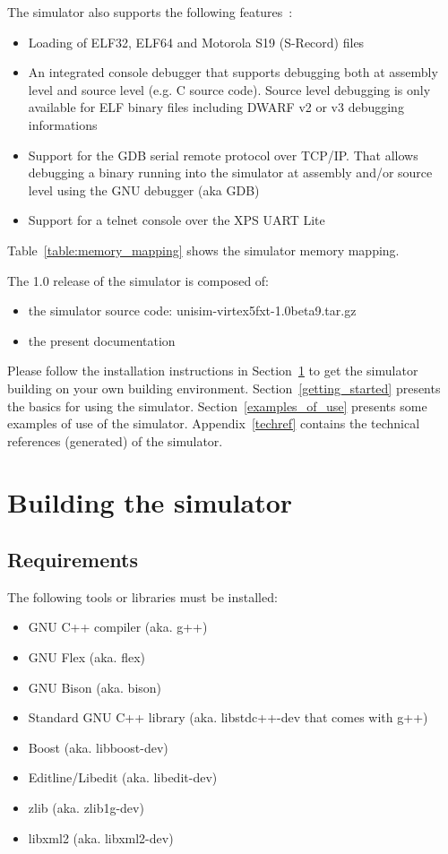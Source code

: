 \cleardoublepage

\noindent The simulator also supports the following features :
\begin{itemize}
\item Loading of ELF32, ELF64 \cite{ELF} and Motorola S19 (S-Record) \cite{S19} files
\item An integrated console debugger that supports debugging both at assembly level and source level (e.g. C source code). Source level debugging is only available for ELF binary files including DWARF v2 or v3 \cite{DWARF3} debugging informations
\item Support for the GDB \cite{GDB} serial remote protocol over TCP/IP. That allows debugging a binary running into the simulator at assembly and/or source level using the GNU debugger (aka GDB)
\item Support for a telnet console over the XPS UART Lite
\end{itemize}

Table~\ref{table:memory_mapping} shows the simulator memory mapping.

\noindent The 1.0 release of the simulator is composed of:
\begin{itemize}
\item the simulator source code: unisim-virtex5fxt-1.0beta9.tar.gz
\item the present documentation
\end{itemize}

Please follow the installation instructions in Section~\ref{building_simulator} to get the simulator building on your own building environment.
Section~\ref{getting_started} presents the basics for using the simulator.
Section~\ref{examples_of_use} presents some examples of use of the simulator.
Appendix~\ref{techref} contains the technical references (generated) of the simulator.

\section{Building the simulator}
\label{building_simulator}

\subsection{Requirements}

\noindent The following tools or libraries must be installed:
\begin{itemize}
\item GNU C++ compiler (aka. g++)
\item GNU Flex (aka. flex)
\item GNU Bison (aka. bison)
\item Standard GNU C++ library (aka. libstdc++-dev that comes with g++)
\item Boost (aka. libboost-dev)
\item Editline/Libedit (aka. libedit-dev)
\item zlib (aka. zlib1g-dev)
\item libxml2 (aka. libxml2-dev)
\end{itemize}


